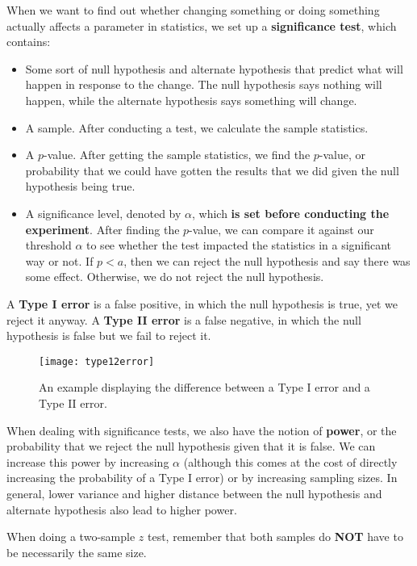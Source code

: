 When we want to find out whether changing something or doing something actually
affects a parameter in statistics, we set up a \textbf{significance test},
which contains:
\begin{itemize}
    \item Some sort of null hypothesis and alternate hypothesis that predict
        what will happen in response to the change. The null hypothesis says
        nothing will happen, while the alternate hypothesis says something will
        change.
    \item A sample. After conducting a test, we calculate the sample statistics.
    \item A \( p \)-value. After getting the sample statistics, we find the \(
        p \)-value, or probability that we could have gotten the results that
        we did given the null hypothesis being true.
    \item A significance level, denoted by \( \alpha \), which \textbf{is set
        before conducting the experiment}. After finding the \( p \)-value, we
        can compare it against our threshold \( \alpha \) to see whether the
        test impacted the statistics in a significant way or not. If \( p < a
        \), then we can reject the null hypothesis and say there was some
        effect. Otherwise, we do not reject the null hypothesis.
\end{itemize}

\begin{blackbox}
    \begin{definition}
        A \textbf{Type I error} is a false positive, in which the null
        hypothesis is true, yet we reject it anyway. A \textbf{Type II error}
        is a false negative, in which the null hypothesis is false but we fail
        to reject it.
    \end{definition}
\end{blackbox}

\begin{figure}[t]
    \centering
    \texttt{[image: type12error]}
    \caption{An example displaying the difference between a Type I error and a Type II error.}
\end{figure}

When dealing with significance tests, we also have the notion of
\textbf{power}, or the probability that we reject the null hypothesis given
that it is false. We can increase this power by increasing \( \alpha \)
(although this comes at the cost of directly increasing the probability of a
Type I error) or by increasing sampling sizes. In general, lower variance and
higher distance between the null hypothesis and alternate hypothesis also lead
to higher power.

When doing a two-sample \( z \) test, remember that both samples do
\textbf{NOT} have to be necessarily the same size.
